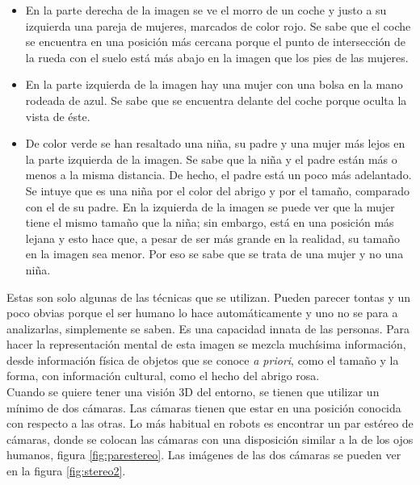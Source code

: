 \begin{itemize}

\item En la parte derecha de la imagen se ve el morro de un coche y justo a su izquierda una pareja de mujeres, marcados de color rojo. Se sabe que el coche se encuentra en una posición más cercana porque el punto de intersección de la rueda con el suelo está más abajo en la imagen que los pies de las mujeres.

\item En la parte izquierda de la imagen hay una mujer con una bolsa en la mano rodeada de azul. Se sabe que se encuentra delante del coche porque oculta la vista de éste.

\item De color verde se han resaltado una niña, su padre y una mujer más lejos en la parte izquierda de la imagen. Se sabe que la niña y el padre están más o menos a la misma distancia. De hecho, el padre está un poco más adelantado. Se intuye que es una niña por el color del abrigo y por el tamaño, comparado con el de su padre. En la izquierda de la imagen se puede ver que la mujer tiene el mismo tamaño que la niña; sin embargo, está en una posición más lejana y esto hace que, a pesar de ser más grande en la realidad, su tamaño en la imagen sea menor. Por eso se sabe que se trata de una mujer y no una niña.

\end{itemize}

Estas son solo algunas de las técnicas que se utilizan. Pueden parecer tontas y un poco obvias porque el ser humano lo hace automáticamente y uno no se para a analizarlas, simplemente se saben. Es una capacidad innata de las personas. Para hacer la representación mental de esta imagen se mezcla muchísima información, desde información física de objetos que se conoce \textit{a priori}, como el tamaño y la forma, con información cultural, como el hecho del abrigo rosa. \\

Cuando se quiere tener una visión 3D del entorno, se tienen que utilizar un mínimo de dos cámaras. Las cámaras tienen que estar en una posición conocida con respecto a las otras. Lo más habitual en robots es encontrar un par estéreo de cámaras, donde se colocan las cámaras con una disposición similar a la de los ojos humanos, figura \ref{fig:parestereo}. Las imágenes de las dos cámaras se pueden ver en la figura \ref{fig:stereo2}.

